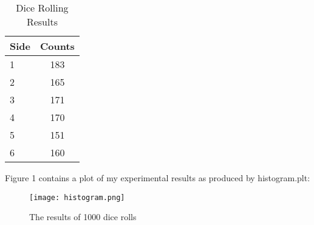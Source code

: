 \documentclass{article}
\begin{document}
		\begin{table}[h!]
	
			\centering
		
			\caption{Dice Rolling Results}
		
			\label{tab:table1}
		
			\begin{tabular}{l||c}
				
				Side & Counts\\
				
				\hline
				
				1 & 183\\
				
				2 & 165\\
				
				3 & 171\\
				
				4 & 170\\
				
				5 & 151\\
				
				6 & 160\\
				
			\end{tabular}
			
		\end{table}
Figure 1 contains a plot of my experimental results as produced by histogram.plt:
	
	\begin{figure}[h!]
		\texttt{[image: histogram.png]}
		
		\caption{The results of 1000 dice rolls}
		
		\label{fig:results1}
		
	\end{figure}
\end{document}

